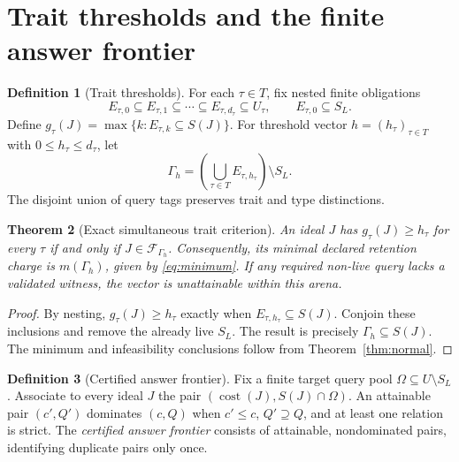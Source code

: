 \documentclass[10pt,letterpaper]{article}
\newtheorem{theorem}{Theorem}[section]
\theoremstyle{definition}
\newtheorem{definition}[theorem]{Definition}
\theoremstyle{remark}
\newcommand{\cost}{\operatorname{cost}}
\begin{document}
\section{Trait thresholds and the finite answer frontier}\label{gl-first-W2-s8}
\begin{definition}[Trait thresholds]
For each $\tau\in T$, fix nested finite obligations
\[
E_{\tau,0}\subseteq E_{\tau,1}\subseteq\cdots\subseteq E_{\tau,d_\tau}\subseteq U_\tau,
\qquad E_{\tau,0}\subseteq S_L.
\]
Define $g_\tau(J)=\max\{k:E_{\tau,k}\subseteq S(J)\}$. For threshold vector $h=(h_\tau)_{\tau\in T}$ with $0\le h_\tau\le d_\tau$, let
\[
\Gamma_h=\left(\bigcup_{\tau\in T}E_{\tau,h_\tau}\right)\setminus S_L.
\]
The disjoint union of query tags preserves trait and type distinctions.
\end{definition}

\begin{theorem}[Exact simultaneous trait criterion]
An ideal $J$ has $g_\tau(J)\ge h_\tau$ for every $\tau$ if and only if $J\in\mathcal F_{\Gamma_h}$. Consequently, its minimal declared retention charge is $m(\Gamma_h)$, given by \eqref{eq:minimum}. If any required non-live query lacks a validated witness, the vector is unattainable within this arena.
\end{theorem}
\begin{proof}
By nesting, $g_\tau(J)\ge h_\tau$ exactly when $E_{\tau,h_\tau}\subseteq S(J)$. Conjoin these inclusions and remove the already live $S_L$. The result is precisely $\Gamma_h\subseteq S(J)$. The minimum and infeasibility conclusions follow from Theorem~\ref{thm:normal}.\end{proof}

\begin{definition}[Certified answer frontier]
Fix a finite target query pool $\Omega\subseteq U\setminus S_L$. Associate to every ideal $J$ the pair $(\cost(J),S(J)\cap\Omega)$. An attainable pair $(c',Q')$ dominates $(c,Q)$ when $c'\le c$, $Q'\supseteq Q$, and at least one relation is strict. The \emph{certified answer frontier} consists of attainable, nondominated pairs, identifying duplicate pairs only once.
\end{definition}
\end{document}
